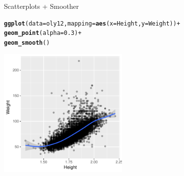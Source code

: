 \documentclass[10pt]{beamer}\usepackage[]{graphicx}\usepackage[]{color}
\makeatletter
\newcommand{\hlnum}[1]{\textcolor[rgb]{0.686,0.059,0.569}{#1}}%
\newcommand{\hlopt}[1]{\textcolor[rgb]{0,0,0}{#1}}%
\newcommand{\hlstd}[1]{\textcolor[rgb]{0.345,0.345,0.345}{#1}}%
\newcommand{\hlkwc}[1]{\textcolor[rgb]{0.333,0.667,0.333}{#1}}%
\newcommand{\hlkwd}[1]{\textcolor[rgb]{0.737,0.353,0.396}{\textbf{#1}}}%
\newenvironment{kframe}{%
 \def\at@end@of@kframe{}%
 \ifinner\ifhmode%
  \def\at@end@of@kframe{\end{minipage}}%
  \begin{minipage}{\columnwidth}%
 \fi\fi%
 \def\FrameCommand##1{\hskip\@totalleftmargin \hskip-\fboxsep
 \colorbox{shadecolor}{##1}\hskip-\fboxsep
     \hskip-\linewidth \hskip-\@totalleftmargin \hskip\columnwidth}%
 \MakeFramed {\advance\hsize-\width
   \@totalleftmargin\z@ \linewidth\hsize
   \@setminipage}}%
 {\par\unskip\endMakeFramed%
 \at@end@of@kframe}
\newenvironment{knitrout}{}{} %
\makeatother
\begin{document}
\begin{frame}[fragile]{Scatterplots + Smoother}
\begin{knitrout}\small
{}\color{fgcolor}\begin{kframe}
\begin{alltt}
\hlkwd{ggplot}\hlstd{(}\hlkwc{data} \hlstd{= oly12,} \hlkwc{mapping} \hlstd{=} \hlkwd{aes}\hlstd{(}\hlkwc{x} \hlstd{= Height,} \hlkwc{y} \hlstd{= Weight))} \hlopt{+}
 \hlkwd{geom_point}\hlstd{(}\hlkwc{alpha} \hlstd{=} \hlnum{0.3}\hlstd{)} \hlopt{+}
 \hlkwd{geom_smooth}\hlstd{()}
\end{alltt}
\end{kframe}
\includegraphics[width=2.5in,height=2.5in]{figure/unnamed-chunk-7-1} 

\end{knitrout}
\end{frame}
\end{document}
